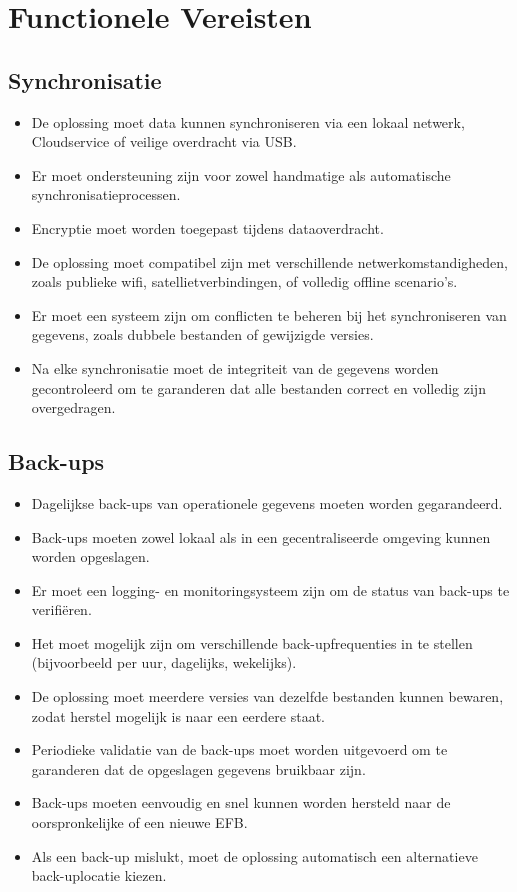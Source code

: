     \section{Functionele Vereisten}
    
    \subsection{Synchronisatie}
    \begin{itemize}
        \item De oplossing moet data kunnen synchroniseren via een lokaal netwerk, Cloudservice of veilige overdracht via USB.
        \item Er moet ondersteuning zijn voor zowel handmatige als automatische synchronisatieprocessen.
        \item Encryptie moet worden toegepast tijdens dataoverdracht.
        \item De oplossing moet compatibel zijn met verschillende netwerkomstandigheden, zoals publieke wifi, satellietverbindingen, of volledig offline scenario's.
        \item Er moet een systeem zijn om conflicten te beheren bij het synchroniseren van gegevens, zoals dubbele bestanden of gewijzigde versies.
        \item Na elke synchronisatie moet de integriteit van de gegevens worden gecontroleerd om te garanderen dat alle bestanden correct en volledig zijn overgedragen.
    \end{itemize}
    
    \subsection{Back-ups}
    \begin{itemize}
        \item Dagelijkse back-ups van operationele gegevens moeten worden gegarandeerd.
        \item Back-ups moeten zowel lokaal als in een gecentraliseerde omgeving kunnen worden opgeslagen.
        \item Er moet een logging- en monitoringsysteem zijn om de status van back-ups te verifiëren.
        \item Het moet mogelijk zijn om verschillende back-upfrequenties in te stellen (bijvoorbeeld per uur, dagelijks, wekelijks).
        \item De oplossing moet meerdere versies van dezelfde bestanden kunnen bewaren, zodat herstel mogelijk is naar een eerdere staat.
        \item Periodieke validatie van de back-ups moet worden uitgevoerd om te garanderen dat de opgeslagen gegevens bruikbaar zijn.
        \item Back-ups moeten eenvoudig en snel kunnen worden hersteld naar de oorspronkelijke of een nieuwe EFB.
        \item Als een back-up mislukt, moet de oplossing automatisch een alternatieve back-uplocatie kiezen.
    \end{itemize}
    
